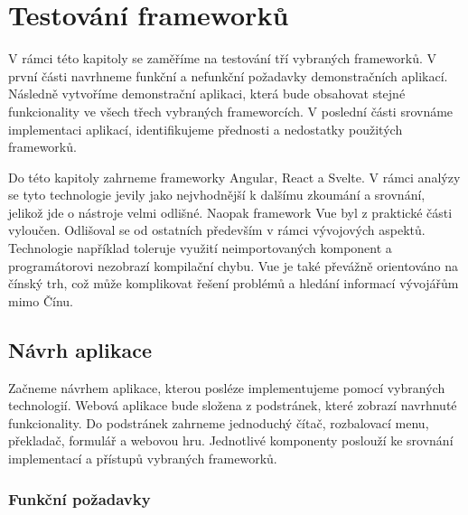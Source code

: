 \section{Testování frameworků}

V rámci této kapitoly se zaměříme na testování tří vybraných frameworků. V první části navrhneme funkční a nefunkční požadavky demonstračních aplikací. 
Následně vytvoříme demonstrační aplikaci, která bude obsahovat stejné funkcionality ve všech třech vybraných frameworcích. 
V poslední části srovnáme implementaci aplikací, identifikujeme přednosti a nedostatky použitých frameworků.

Do této kapitoly zahrneme frameworky Angular, React a Svelte. V rámci analýzy se tyto technologie jevily jako nejvhodnější k dalšímu zkoumání a srovnání, jelikož jde o nástroje velmi odlišné. 
Naopak framework Vue byl z praktické části vyloučen. Odlišoval se od ostatních především v rámci vývojových aspektů. 
Technologie například toleruje využití neimportovaných komponent a programátorovi nezobrazí kompilační chybu. 
Vue je také převážně orientováno na čínský trh, což může komplikovat řešení problémů a hledání informací vývojářům mimo Čínu.

\subsection{Návrh aplikace}

Začneme návrhem aplikace, kterou posléze implementujeme pomocí vybraných technologií. 
Webová aplikace bude složena z podstránek, které zobrazí navrhnuté funkcionality. 
Do podstránek zahrneme jednoduchý čítač, rozbalovací menu, překladač, formulář a webovou hru. 
Jednotlivé komponenty poslouží ke srovnání implementací a přístupů vybraných frameworků.

\subsubsection{Funkční požadavky}

